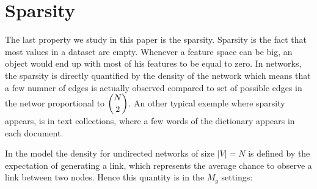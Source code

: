 \section{Sparsity}
\label{sec:sparsity}

The last property we study in this paper is the sparsity. Sparsity is the fact that most values in a dataset are empty. Whenever a feature space can be big, an object would end up with most of his features to be equal to zero. In networks, the sparsity is directly quantified by the density of the network which means that a few numner of edges is actually observed compared to set of possible edges in the networ proportional to $\dbinom{N}{2}$. An other typical exemple where sparsity appears, is in text collections, where a few words of the dictionary appears in each document.




In the model the density for undirected networks of size $|V|=N$ is defined by the expectation of generating a link, which represents the average chance to observe a link between two nodes. Hence this quantity is in the $M_g$ settings:


